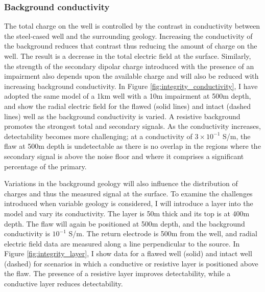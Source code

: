 

\subsubsection{Background conductivity}

The total charge on the well is controlled by the contrast in conductivity between the steel-cased well and the surrounding geology. Increasing the conductivity of the background reduces that contrast thus reducing the amount of charge on the well. The result is a decrease in the total electric field at the surface. Similarly, the strength of the secondary dipolar charge introduced with the presence of an impairment also depends upon the available charge and will also be reduced with increasing background conductivity. In Figure \ref{fig:integrity_conductivity}, I have adopted the same model of a 1km well with a 10m impairment at 500m depth, and show the radial electric field for the flawed (solid lines) and intact (dashed lines) well as the background conductivity is varied. A resistive background promotes the strongest total and secondary signals. As the conductivity increases, detectability becomes more challenging; at a conductivity of $3 \times 10^{-1}$ S/m, the flaw at 500m depth is undetectable as there is no overlap in the regions where the secondary signal is above the noise floor and where it comprises a significant percentage of the primary.




Variations in the background geology will also influence the distribution of charges and thus the measured signal at the surface. To examine the challenges introduced when variable geology is considered, I will introduce a layer into the model and vary its conductivity. The layer is 50m thick and its top is at 400m depth. The flaw will again be positioned at 500m depth, and the background conductivity is $10^{-1}$ S/m. The return electrode is 500m from the well, and radial electric field data are measured along a line perpendicular to the source. In Figure \ref{fig:integrity_layer}, I show data for a flawed well (solid) and intact well (dashed) for scenarios in which a conductive or resistive layer is positioned above the flaw. The presence of a resistive layer improves detectability, while a conductive layer reduces detectability.



